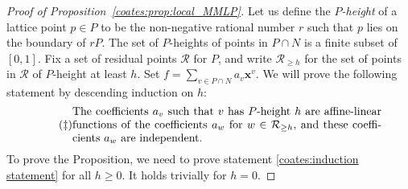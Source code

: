 \begin{proof}[Proof of Proposition~\ref{coates:prop:local_MMLP}]
Let us define the \emph{$P$-height} of a lattice point $p \in P$ to be the non-negative rational number $r$ such that $p$ lies on the boundary of $rP$. The set of $P$-heights of points in $P \cap N$ is a finite subset of $[0,1]$. Fix a set of residual points $\mathcal{R}$ for $P$, and write $\mathcal{R}_{\geq h}$ for the set of points in $\mathcal{R}$ of $P$-height at least $h$. Set $f = \sum_{v \in P \cap N} a_v \bm{x}^v$. We will prove the following statement by descending induction on $h$:
  \begin{equation}
  \tag{$\ddagger$}
  \label{coates:induction statement}
  \begin{minipage}{0.8\textwidth}
    The coefficients $a_v$ such that $v$ has $P$-height $h$ are affine-linear functions of the coefficients $a_w$ for $w \in \mathcal{R}_{\geq h}$, and these coefficients $a_w$ are independent.
  \end{minipage}
  \end{equation}
  \noindent To prove the Proposition, we need to prove statement \eqref{coates:induction statement} for all $h \geq 0$. It holds trivially for $h=0$.


\end{proof}

